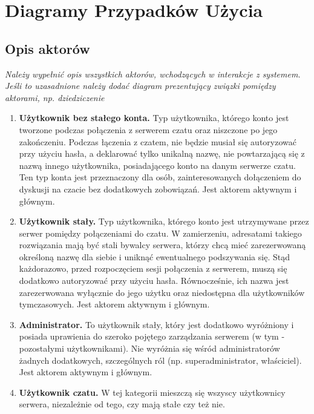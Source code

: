 \section{Diagramy Przypadków Użycia}

\subsection{Opis aktorów}
\textit{Należy wypełnić opis wszystkich aktorów, wchodzących w interakcje z systemem. Jeśli to uzasadnione należy dodać diagram prezentujący związki pomiędzy aktorami, np. dziedziczenie}

\begin{enumerate}
	\item \textbf{Użytkownik bez stałego konta.} Typ użytkownika, którego konto jest tworzone podczas połączenia z serwerem czatu oraz 
		niszczone po jego zakończeniu. Podczas łączenia z czatem, nie będzie musiał się autoryzować przy użyciu hasła, a deklarować
		tylko unikalną nazwę, nie powtarzającą się z nazwą innego użytkownika, posiadającego konto na danym serwerze czatu. Ten typ
		konta jest przeznaczony dla osób, zainteresowanych dołączeniem do dyskusji na czacie bez dodatkowych zobowiązań. Jest aktorem aktywnym
		i głównym.
		
	\item \textbf{Użytkownik stały.} Typ użytkownika, którego konto jest utrzymywane przez serwer pomiędzy połączeniami do czatu. W
		zamierzeniu, adresatami takiego rozwiązania mają być stali bywalcy serwera, którzy chcą mieć zarezerwowaną określoną nazwę
		dla siebie i uniknąć ewentualnego podszywania się. Stąd każdorazowo, przed rozpoczęciem sesji połączenia z serwerem, muszą się
		dodatkowo autoryzować przy użyciu hasła. Równocześnie, ich nazwa jest zarezerwowana wyłącznie do jego użytku oraz niedostępna
		dla użytkowników tymczasowych.  Jest aktorem aktywnym i głównym.
		
	\item \textbf{Administrator.} To użytkownik stały, który jest dodatkowo wyróżniony i posiada uprawienia do szeroko pojętego 
		zarządzania serwerem (w tym - pozostałymi użytkownikami). Nie wyróżnia się wśród administratorów żadnych dodatkowych, szczególnych
		ról (np. superadministrator, właściciel).  Jest aktorem aktywnym i głównym.
		
	\item \textbf{Użytkownik czatu.} W tej kategorii mieszczą się wszyscy
	użytkownicy serwera, niezależnie od tego, czy mają stałe czy też nie.

\end{enumerate}

